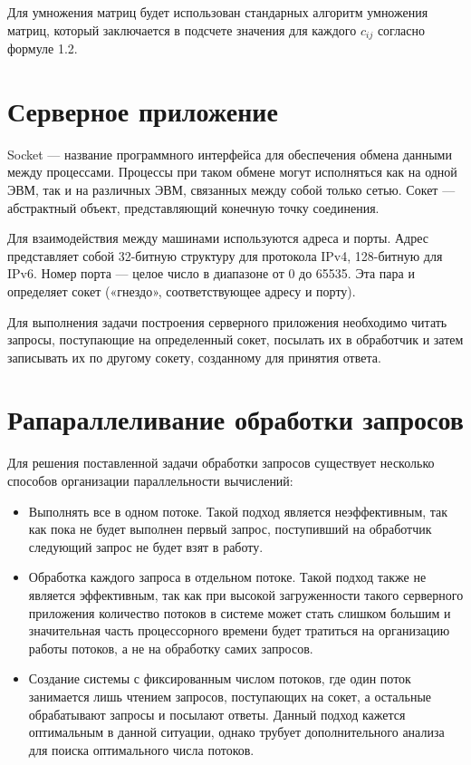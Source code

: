 Для умножения матриц будет использован стандарных алгоритм умножения матриц, который заключается 
в подсчете  значения для каждого $c_{ij}$ согласно формуле 1.2.

\section{Серверное приложение}

Socket — название программного интерфейса для обеспечения обмена данными между процессами. Процессы при таком обмене могут исполняться как на одной ЭВМ, так и на различных ЭВМ, связанных между собой только сетью. Сокет — абстрактный объект, представляющий конечную точку соединения.

Для взаимодействия между машинами используются адреса и порты. Адрес представляет собой 32-битную структуру для протокола IPv4, 128-битную для IPv6. Номер порта — целое число в диапазоне от 0 до 65535. Эта пара и определяет сокет («гнездо», соответствующее адресу и порту).

Для выполнения задачи построения серверного приложения необходимо читать запросы, поступающие на определенный сокет, посылать их в обработчик и затем записывать их по другому сокету, созданному для принятия ответа.

\section{Рапараллеливание обработки запросов}

Для решения поставленной задачи обработки запросов существует несколько способов организации параллельности вычислений:

\begin{itemize}
	\item Выполнять все в одном потоке. Такой подход является неэффективным, так как пока не будет выполнен первый запрос, поступивший на обработчик следующий запрос не будет взят в работу. 
	\item Обработка каждого запроса в отдельном потоке. Такой подход также не является эффективным, так как при высокой загруженности такого серверного приложения количество потоков в системе может стать слишком большим и значительная часть процессорного времени будет тратиться на организацию работы потоков, а не на обработку самих запросов.
	\item Создание системы с фиксированным числом потоков, где один поток занимается лишь чтением запросов, поступающих на сокет, а остальные обрабатывают запросы и посылают ответы. Данный подход кажется оптимальным в данной ситуации, однако трубует дополнительного анализа для поиска оптимального числа потоков.
\end{itemize}


